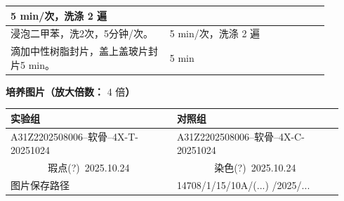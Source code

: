\documentclass[UTF8,10pt,a4paper,fontset=fandol]{ctexart}
\newcommand{\fieldvalue}[1]{#1}
\newcommand{\handwritten}[1]{#1}
\begin{document}
\begin{tabular}{|p{0.20\linewidth}|p{0.25\linewidth}|p{0.20\linewidth}|p{0.25\linewidth}|}
\multicolumn{2}{l|}{%
\fieldvalue{\handwritten{5}} min/次，洗涤
\fieldvalue{\handwritten{2}} 遍}
\\ \hline
\multicolumn{2}{|l|}{浸泡二甲苯，洗2次，5分钟/次。} &
\multicolumn{2}{l|}{%
\fieldvalue{\handwritten{5}} min/次，洗涤
\fieldvalue{\handwritten{2}} 遍}
\\ \hline
\multicolumn{2}{|l|}{滴加中性树脂封片，盖上盖玻片封片5 min。} &
\multicolumn{2}{l|}{%
\fieldvalue{\handwritten{5}} min}
\\ \hline
\end{tabular}

\medskip

\begin{center}
\textbf{培养图片（放大倍数：}
\fieldvalue{\handwritten{4}} 倍\textbf{）}
\end{center}

\noindent
\begin{tabular}{|p{0.47\linewidth}|p{0.47\linewidth}|}
\hline
实验组 & 对照组 \\ \hline
\centering A31Z2202508006--软骨--4X-T-20251024
&
\centering A31Z2202508006--软骨--4X-C-20251024
\\[5.0cm] \hline
\multicolumn{1}{|c|}{%
\handwritten{瑕点(?)\ 2025.10.24}}
&
\multicolumn{1}{c|}{%
\handwritten{染色(?)\ 2025.10.24}}
\\ \hline
图片保存路径 &
\handwritten{14708/1/15/10A/(...) /2025/...}
\\ \hline
\end{tabular}

\medskip
\end{document}
